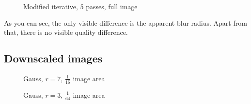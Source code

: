 \documentclass[english,fleqn,10pt,twocolumn]{article}
\begin{document}
\begin{figure}[H]
    \centering {}
    \caption{Modified iterative, 5 passes, full image}
\end{figure}

As you can see, the only visible difference is the apparent blur radius. Apart from that, there is no visible quality difference.

\subsection{Downscaled images}

\begin{figure}[H]
    \centering {}
    \caption{Gauss, $r = 7$, $\frac 1{16}$ image area}
\end{figure}

\begin{figure}[H]
    \centering {}
    \caption{Gauss, $r = 3$, $\frac 1{64}$ image area}
\end{figure}
\end{document}
